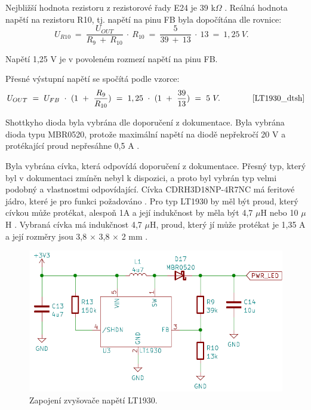 Nejbližší hodnota rezistoru z rezistorové řady E24 je 39 k$\Omega$ \cite{rezistorova_rada}. Reálná hodnota napětí na rezistoru R10, tj. napětí na pinu FB byla dopočítána
dle rovnice:
\begin{equation} 
  U_{R10}~=~\frac{U_{OUT}}{R_{9}~+~R_{10}}~\cdot~R_{10}~=~\frac{5}{39~+~13}~\cdot~13~=~1,25~V. 
  \quad
\label{eq:UR10}
\end{equation}

Napětí 1,25 V je v povoleném rozmezí napětí na pinu FB. 

Přesné výstupní napětí se spočítá podle vzorce:
\begin{equation} 
  U_{OUT}~=~U_{FB}~\cdot~(1~+~\frac{R_{9}}{R_{10}})~=~1,25~\cdot~(1~+~\frac{39}{13})~=~5~V. 
  \quad \quad \quad \quad \cite{LT1930_dtsh}
\label{eq:VOUT_LT1930}
\end{equation}

Shottkyho dioda byla vybrána dle doporučení z dokumentace. Byla vybrána dioda typu MBR0520, protože maximální napětí na diodě nepřekročí 20 V a protékající proud nepřesáhne 
0,5 A \cite{LT1930_dtsh}.

Byla vybrána cívka, která odpovídá doporučení z dokumentace. Přesný typ, který byl v dokumentaci zmíněn nebyl k dispozici, a proto byl vybrán typ velmi podobný a vlastnostmi 
odpovídající. Cívka CDRH3D18NP-4R7NC má feritové jádro, které je pro funkci požadováno \cite{LT1930_dtsh}. Pro typ LT1930 by měl být proud, který cívkou může protékat, alespoň
1A a její indukčnost by měla být 4,7 $\mu$H nebo 10 $\mu$H \cite{LT1930_dtsh}. Vybraná cívka má indukčnost 4,7 $\mu$H, proud, který jí může protékat je 1,35 A a její rozměry 
jsou 3,8 $\times$ 3,8 $\times$ 2 mm \cite{civka_dtsh}.

\begin{figure}[!h]
  \begin{center}
    \includegraphics[scale=0.7]{obrazky/LT1930.png}
  \end{center}
  \caption[Zapojení zvyšovače napětí LT1930]{Zapojení zvyšovače napětí LT1930.}
\end{figure}

